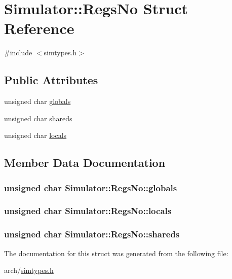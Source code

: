 \hypertarget{struct_simulator_1_1_regs_no}{\section{Simulator\+:\+:Regs\+No Struct Reference}
\label{struct_simulator_1_1_regs_no}
}


{\ttfamily \#include $<$simtypes.\+h$>$}

\subsection*{Public Attributes}
\begin{DoxyCompactItemize}
\item 
unsigned char \hyperlink{struct_simulator_1_1_regs_no_aabe33d1aedd4e8255589dbecb16d3461}{globals}
\item 
unsigned char \hyperlink{struct_simulator_1_1_regs_no_aa46a99e588d72fa10b4de4afaaf697e2}{shareds}
\item 
unsigned char \hyperlink{struct_simulator_1_1_regs_no_a3321e5b040d2bdc27f7721b72fdffbef}{locals}
\end{DoxyCompactItemize}


\subsection{Member Data Documentation}
\hypertarget{struct_simulator_1_1_regs_no_aabe33d1aedd4e8255589dbecb16d3461}{
\subsubsection[{globals}]{\setlength{\rightskip}{0pt plus 5cm}unsigned char Simulator\+::\+Regs\+No\+::globals}}\label{struct_simulator_1_1_regs_no_aabe33d1aedd4e8255589dbecb16d3461}
\hypertarget{struct_simulator_1_1_regs_no_a3321e5b040d2bdc27f7721b72fdffbef}{
\subsubsection[{locals}]{\setlength{\rightskip}{0pt plus 5cm}unsigned char Simulator\+::\+Regs\+No\+::locals}}\label{struct_simulator_1_1_regs_no_a3321e5b040d2bdc27f7721b72fdffbef}
\hypertarget{struct_simulator_1_1_regs_no_aa46a99e588d72fa10b4de4afaaf697e2}{
\subsubsection[{shareds}]{\setlength{\rightskip}{0pt plus 5cm}unsigned char Simulator\+::\+Regs\+No\+::shareds}}\label{struct_simulator_1_1_regs_no_aa46a99e588d72fa10b4de4afaaf697e2}


The documentation for this struct was generated from the following file\+:\begin{DoxyCompactItemize}
\item 
arch/\hyperlink{simtypes_8h}{simtypes.\+h}\end{DoxyCompactItemize}

